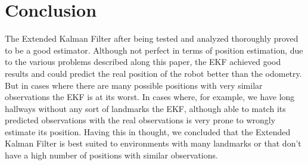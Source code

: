 \section{Conclusion}
\label{sec:Conclusion}


The Extended Kalman Filter after being tested and analyzed thoroughly proved to be a good estimator. Although not perfect in terms of position estimation, due to the various problems described along this paper, the EKF achieved good results and could predict the real position of the robot better than the odometry. But in cases where there are many possible positions with very similar observations the EKF is at its worst. In cases where, for example, we have long hallways without any sort of landmarks the EKF, although able to match its predicted observations with the real observations is very prone to wrongly estimate its position. Having this in thought, we concluded that the Extended Kalman Filter is best suited to environments with many landmarks or that don't have a high number of positions with similar observations. 


